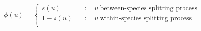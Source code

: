 \documentclass{standalone}
\begin{document}
{\tiny
$\phi(u) = \left\{ \begin{array}{ll}
s(u)   & \quad : \quad u\ \textrm{between-species splitting process}\\
1-s(u) & \quad : \quad u\ \textrm{within-species splitting process}\\
\end{array}\right.$
}
\end{document}
